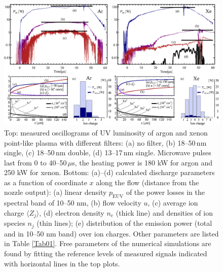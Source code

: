 \documentclass[aip, apl, amsmath,amssymb, reprint]{revtex4-1}
\begin{document}
\begin{figure}[bt]
\includegraphics[width=173mm]{FIG03} 
\caption{Top: measured oscillograms of UV luminosity of argon and xenon point-like plasma with different filters: (a) no filter, (b) 18--50\,nm single, (c) 18--50\,nm double, (d) 13--17\,nm single. Microwave pulses last from 0 to 40--50$\,\mu$s, the heating power is 180 kW for argon and 250 kW for xenon. 
Bottom: (a)--(d) calculated discharge parameters as a function of coordinate $x$ along the flow (distance from the nozzle output): (a) linear density $p_{\text{EUV}}$ of the power losses in the spectral band of 10--50 nm, (b) flow velocity $u$, (c) average ion charge $\langle Z_j\rangle$, (d) electron density $n_e$ (thick line) and densities of ion species $n_j$ (thin lines); (e) distribution of the emission power (total and in 10--50 nm band) over ion charges. Other parameters are listed in Table \ref{Tab01}. Free parameters of the numerical simulations are found by fitting the reference levels of measured signals indicated with horizontal lines in the top plots.
}\label{Fig03}
\end{figure}
 
\end{document}
